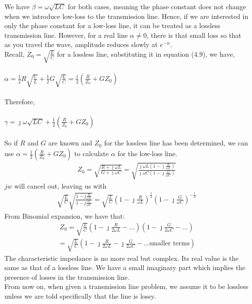 We have $\beta = \omega\sqrt{LC}$ for both cases, meaning the phase constant does not change when we introduce low-loss to the transmission line. Hence, if we are interested in only the phase constant for a low-loss line, it can be treated as a lossless transmission line. However, for a real line $\alpha \neq 0$, there is that small loss so that as you travel the wave, amplitude reduces slowly at $e^{-\alpha}$.\\ Recall, $Z_0 = \sqrt{\frac{L}{C}}$ for a lossless line, substituting it in equation (4.9), we have,\\\\
$\alpha = \frac{1}{2}R\sqrt{\frac{C}{L}} + \frac{1}{2}G\sqrt{\frac{L}{C}} = \frac{1}{2}(\frac{R}{Z_0} + GZ_0)$\\\\
Therefore,\\\\
$\gamma = \jmath\omega\sqrt{LC} + \frac{1}{2}(\frac{R}{Z_0} + GZ_0)$\\\\
So if $R$ and $G$ are known and $Z_0$ for the lossless line has been determined, we can use $\alpha = \frac{1}{2}(\frac{R}{Z_0} + GZ_0)$ to calculate $\alpha$ for the low-loss line.
\begin{align*}
Z_0 = \sqrt{\frac{R + \jmath\omega L}{G + \jmath\omega C}} = \sqrt{\frac{\jmath\omega L(1 - \jmath\frac{R}{\omega L})}{\jmath\omega C(1 - \jmath\frac{G}{\omega C})}}
\end{align*}
$jw$ will cancel out, leaving us with
\begin{align*}
\sqrt{\frac{L}{C}}\sqrt{\frac{1 - j\frac{R}{\omega L}}{1 - j\frac{G}{\omega C}}} =\sqrt{\frac{L}{C}}\left(1 - \jmath\frac{R}{\omega L}\right)^{\frac{1}{2}}\left(1 - \jmath\frac{G}{\omega C}\right)^{-\frac{1}{2}} 
\end{align*}
From Binomial expansion, we have that:
\begin{align*}
Z_0 = \sqrt{\frac{L}{C}}\left(1 - \jmath\frac{R}{2\omega L} - ...\right)\left(1 - \jmath\frac{G}{2\omega C} - ...\right)
\end{align*}
\begin{align*}
= \sqrt{\frac{L}{C}}\left(1 - \jmath\frac{R}{2\omega L} - \jmath\frac{G}{2\omega C} - \text{...smaller terms}\right)
\end{align*}
The characteristic impedance is no more real but complex. Its real value is the same as that of a lossless line. We have a small imaginary part which implies the presence of losses in the transmission line.\\

From now on, when given a transmission line problem, we assume it to be lossless unless we are told specifically that the line is lossy.